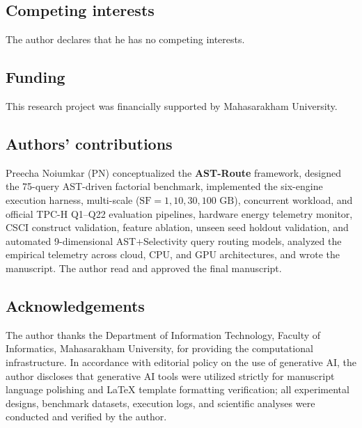 \documentclass[10pt,a4paper]{article}
\begin{document}
\subsection*{Competing interests}
The author declares that he has no competing interests.

\subsection*{Funding}
This research project was financially supported by Mahasarakham University.

\subsection*{Authors' contributions}
Preecha Noiumkar (PN) conceptualized the \textbf{AST-Route} framework, designed the 75-query AST-driven factorial benchmark, implemented the six-engine execution harness, multi-scale ($\text{SF}=1, 10, 30, 100\text{ GB}$), concurrent workload, and official TPC-H Q1--Q22 evaluation pipelines, hardware energy telemetry monitor, CSCI construct validation, feature ablation, unseen seed holdout validation, and automated 9-dimensional AST+Selectivity query routing models, analyzed the empirical telemetry across cloud, CPU, and GPU architectures, and wrote the manuscript. The author read and approved the final manuscript.

\subsection*{Acknowledgements}
The author thanks the Department of Information Technology, Faculty of Informatics, Mahasarakham University, for providing the computational infrastructure. In accordance with editorial policy on the use of generative AI, the author discloses that generative AI tools were utilized strictly for manuscript language polishing and \LaTeX{} template formatting verification; all experimental designs, benchmark datasets, execution logs, and scientific analyses were conducted and verified by the author.
\end{document}
